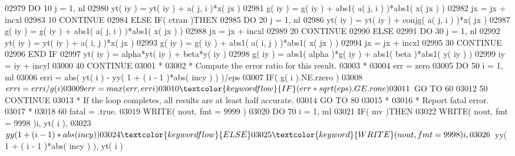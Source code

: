 \begin{DoxyCode}
02979             \textcolor{keywordflow}{DO} 10 j = 1, nl
02980                yt( iy ) = yt( iy ) + a( j, i )*x( jx )
02981                g( iy ) = g( iy ) + abs1( a( j, i ) )*abs1( x( jx ) )
02982                jx = jx + incxl
02983    10       \textcolor{keywordflow}{CONTINUE}
02984          \textcolor{keywordflow}{ELSE} \textcolor{keywordflow}{IF}( ctran )\textcolor{keywordflow}{THEN}
02985             \textcolor{keywordflow}{DO} 20 j = 1, nl
02986                yt( iy ) = yt( iy ) + conjg( a( j, i ) )*x( jx )
02987                g( iy ) = g( iy ) + abs1( a( j, i ) )*abs1( x( jx ) )
02988                jx = jx + incxl
02989    20       \textcolor{keywordflow}{CONTINUE}
02990          \textcolor{keywordflow}{ELSE}
02991             \textcolor{keywordflow}{DO} 30 j = 1, nl
02992                yt( iy ) = yt( iy ) + a( i, j )*x( jx )
02993                g( iy ) = g( iy ) + abs1( a( i, j ) )*abs1( x( jx ) )
02994                jx = jx + incxl
02995    30       \textcolor{keywordflow}{CONTINUE}
02996 \textcolor{keywordflow}{         END IF}
02997          yt( iy ) = alpha*yt( iy ) + beta*y( iy )
02998          g( iy ) = abs1( alpha )*g( iy ) + abs1( beta )*abs1( y( iy ) )
02999          iy = iy + incyl
03000    40 \textcolor{keywordflow}{CONTINUE}
03001 \textcolor{comment}{*}
03002 \textcolor{comment}{*     Compute the error ratio for this result.}
03003 \textcolor{comment}{*}
03004       err = zero
03005       \textcolor{keywordflow}{DO} 50 i = 1, ml
03006          erri = abs( yt( i ) - yy( 1 + ( i - 1 )*abs( incy ) ) )/eps
03007          \textcolor{keywordflow}{IF}( g( i ).NE.rzero )
03008      $      erri = erri/g( i )
03009          err = max( err, erri )
03010          \textcolor{keywordflow}{IF}( err*sqrt( eps ).GE.rone )
03011      $      \textcolor{keywordflow}{GO TO} 60
03012    50 \textcolor{keywordflow}{CONTINUE}
03013 \textcolor{comment}{*     If the loop completes, all results are at least half accurate.}
03014       \textcolor{keywordflow}{GO TO} 80
03015 \textcolor{comment}{*}
03016 \textcolor{comment}{*     Report fatal error.}
03017 \textcolor{comment}{*}
03018    60 fatal = .true.
03019       \textcolor{keyword}{WRITE}( nout, fmt = 9999 )
03020       \textcolor{keywordflow}{DO} 70 i = 1, ml
03021          \textcolor{keywordflow}{IF}( mv )\textcolor{keywordflow}{THEN}
03022             \textcolor{keyword}{WRITE}( nout, fmt = 9998 )i, yt( i ),
03023      $         yy( 1 + ( i - 1 )*abs( incy ) )
03024          \textcolor{keywordflow}{ELSE}
03025             \textcolor{keyword}{WRITE}( nout, fmt = 9998 )i,
03026      $         yy( 1 + ( i - 1 )*abs( incy ) ), yt( i )

\end{DoxyCode}
